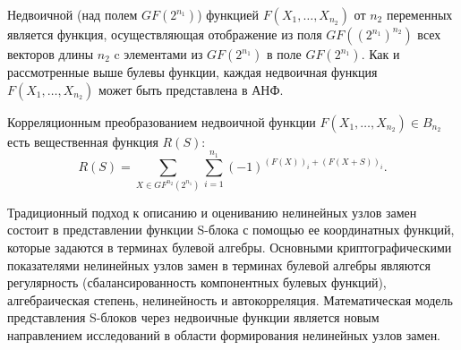 Недвоичной (над полем $GF(2^{n_1})$) функцией $F(X_1, \ldots, X_{n_2})$ от $n_2$
переменных является функция, осуществляющая отображение из поля
$GF((2^{n_1})^{n_2})$ всех векторов длины $n_2$ c элементами из $GF(2^{n_1})$ в
поле $GF(2^{n_1})$. Как и рассмотренные выше булевы функции, каждая недвоичная
функция $F(X_1, \ldots, X_{n_2})$ может быть представлена в АНФ.

Корреляционным преобразованием недвоичной функции $F(X_1, \ldots, X_{n_2}) \in
B_{n_2}$ есть вещественная функция $R(S)$:
\begin{equation}R(S) = \sum_{X \in
GF^{n_2}(2^{n_1})}{\sum^{n_1}_{i=1}{(-1)^{(F(X))_i + (F(X+S))_i}}}.\end{equation}

Традиционный подход к описанию и оцениванию нелинейных узлов замен состоит в
представлении функции S-блока с помощью ее координатных функций, которые
задаются в терминах булевой алгебры. Основными криптографическими показателями
нелинейных узлов замен в терминах булевой алгебры являются регулярность
(сбалансированность компонентных булевых функций), алгебраическая степень,
нелинейность и автокорреляция. Математическая модель представления S-блоков
через недвоичные функции является новым направлением исследований в области
формирования нелинейных узлов замен.
